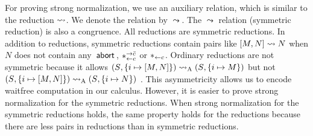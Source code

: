 For proving strong normalization, we use an auxiliary relation, which is
similar to the reduction $\rightsquigarrow$.  We denote
the relation by $\leadsto$.  The $\leadsto$ relation (symmetric
reduction) is also a
congruence.  All reductions are symmetric reductions.
In addition to reductions, symmetric reductions contain pairs like
$[{M, N}]\leadsto N$ when $N$ does not contain any~$\mathsf{abort\,}$,
$\ast^{\rightarrow {\bar{c}}}_{\leftarrow{c}}$ or $\ast_{\leftarrow{c}}$.
Ordinary reductions are not symmetric because it allows
$({S}{},{\{i\mapsto {[{M,N}]}\}})\rightsquigarrow_{\mathrm A} ({S}{},{\{i\mapsto {M}\}})$
but not
$({S}{},{\{i\mapsto {[{M,N}]}\}})\rightsquigarrow_{\mathrm A} ({S}{},{\{i\mapsto {N}\}})$%
.  This asymmetricity allows us to encode waitfree
computation in our calculus.  However, it is easier to prove strong
normalization for the symmetric reductions.  When strong normalization
for the symmetric reductions holds, the same property holds for the
reductions because there are less pairs in reductions than in symmetric
reductions.

